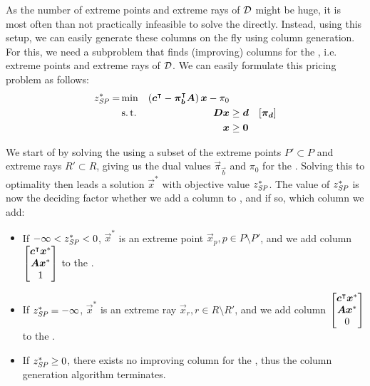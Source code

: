 As the number of extreme points and extreme rays of $\mathcal{D}$ might be huge, it is most often than not practically infeasible to solve the \MP{} directly. Instead, using this setup, we can easily generate these columns on the fly using column generation. For this, we need a subproblem that finds (improving) columns for the \MP{}, i.e. extreme points and extreme rays of $\mathcal{D}$. We can easily formulate this pricing problem as follows:
\begin{equation}
\begin{aligned}
z^*_\SP{} = &\min & \left( \vec{c}\transpose - \vec{\pi}_\vec{b}\transpose \mat{A} \right) \vec{x} - \pi_0 & & \\
&\st & \mat{D} \vec{x} & \geq \vec{d} & \left[\vec{\pi}_\vec{d}\right] \\
&& \vec{x} & \geq \vec{0}
\end{aligned}
\end{equation}

We start of by solving the \RMP{} using a subset of the extreme points $P' \subset P$ and extreme rays $R' \subset R$, giving us the dual values $\vec{\pi}_\vec{b}$ and $\pi_0$ for the \SP{}. Solving this \SP{} to optimality then leads a solution $\vec{x}^*$ with objective value $z^*_\SP{}$. The value of $z^*_\SP{}$ is now the deciding factor whether we add a column to \RMP{}, and if so, which column we add:
\begin{itemize}
\item If $-\infty < z^*_\SP{} < 0$, $\vec{x}^*$ is an extreme point $\vec{x}_p, p \in P \setminus P'$, and we add column $\begin{bmatrix} {\bm{c}}^\intercal {\bm{x}}^* \\ {\bm{A}} {\bm{x}}^* \\ 1 \end{bmatrix}$ to the \RMP{}.
\item If $z^*_\SP{} = -\infty$, $\vec{x}^*$ is an extreme ray $\vec{x}_r, r \in R \setminus R'$, and we add column $\begin{bmatrix} {\bm{c}}^\intercal {\bm{x}}^* \\ {\bm{A}} {\bm{x}}^* \\ 0 \end{bmatrix}$ to the \RMP{}.
\item If $z^*_\SP{} \geq 0$, there exists no improving column for the \RMP{}, thus the column generation algorithm terminates.
\end{itemize}

